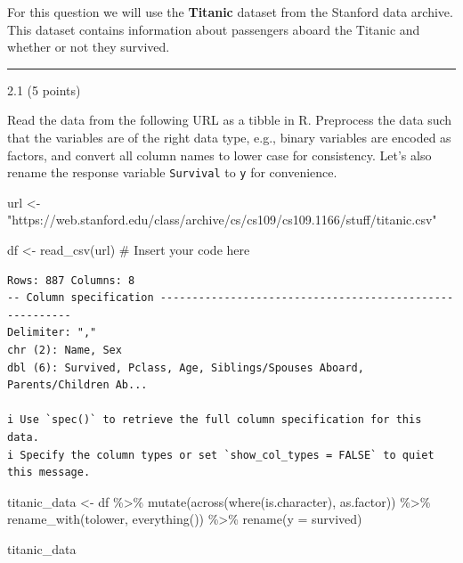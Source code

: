 \documentclass[
  letterpaper,
  DIV=11,
  numbers=noendperiod]{scrartcl}
\newenvironment{Shaded}{\begin{snugshade}}{\end{snugshade}}
\newcommand{\AttributeTok}[1]{\textcolor[rgb]{0.40,0.45,0.13}{#1}}
\newcommand{\CommentTok}[1]{\textcolor[rgb]{0.37,0.37,0.37}{#1}}
\newcommand{\FunctionTok}[1]{\textcolor[rgb]{0.28,0.35,0.67}{#1}}
\newcommand{\NormalTok}[1]{\textcolor[rgb]{0.00,0.23,0.31}{#1}}
\newcommand{\OtherTok}[1]{\textcolor[rgb]{0.00,0.23,0.31}{#1}}
\newcommand{\SpecialCharTok}[1]{\textcolor[rgb]{0.37,0.37,0.37}{#1}}
\newcommand{\StringTok}[1]{\textcolor[rgb]{0.13,0.47,0.30}{#1}}
\begin{document}
For this question we will use the \textbf{Titanic} dataset from the
Stanford data archive. This dataset contains information about
passengers aboard the Titanic and whether or not they survived.

\begin{center}\rule{0.5\linewidth}{0.5pt}\end{center}

2.1 (5 points)

Read the data from the following URL as a tibble in R. Preprocess the
data such that the variables are of the right data type, e.g., binary
variables are encoded as factors, and convert all column names to lower
case for consistency. Let's also rename the response variable
\texttt{Survival} to \texttt{y} for convenience.

\begin{Shaded}
\begin{Highlighting}[]
\NormalTok{url }\OtherTok{\textless{}{-}} \StringTok{"https://web.stanford.edu/class/archive/cs/cs109/cs109.1166/stuff/titanic.csv"}

\NormalTok{df }\OtherTok{\textless{}{-}} \FunctionTok{read\_csv}\NormalTok{(url) }\CommentTok{\# Insert your code here}
\end{Highlighting}
\end{Shaded}

\begin{verbatim}
Rows: 887 Columns: 8
-- Column specification --------------------------------------------------------
Delimiter: ","
chr (2): Name, Sex
dbl (6): Survived, Pclass, Age, Siblings/Spouses Aboard, Parents/Children Ab...

i Use `spec()` to retrieve the full column specification for this data.
i Specify the column types or set `show_col_types = FALSE` to quiet this message.
\end{verbatim}

\begin{Shaded}
\begin{Highlighting}[]
\NormalTok{titanic\_data }\OtherTok{\textless{}{-}}\NormalTok{ df }\SpecialCharTok{\%\textgreater{}\%}
  \FunctionTok{mutate}\NormalTok{(}\FunctionTok{across}\NormalTok{(}\FunctionTok{where}\NormalTok{(is.character), as.factor)) }\SpecialCharTok{\%\textgreater{}\%} 
  \FunctionTok{rename\_with}\NormalTok{(tolower, }\FunctionTok{everything}\NormalTok{()) }\SpecialCharTok{\%\textgreater{}\%}
  \FunctionTok{rename}\NormalTok{(}\AttributeTok{y =}\NormalTok{ survived)}


\NormalTok{titanic\_data}
\end{Highlighting}
\end{Shaded}
\end{document}
